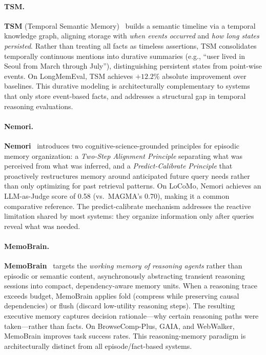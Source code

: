 \paragraph{TSM.}
\textbf{TSM} (Temporal Semantic
Memory)~\cite{tsm2026} builds a semantic timeline via a temporal
knowledge graph, aligning storage with \emph{when events occurred} and
\emph{how long states persisted}.  Rather than treating all facts as
timeless assertions, TSM consolidates temporally continuous mentions
into durative summaries (e.g., ``user lived in Seoul from March through
July''), distinguishing persistent states from point-wise events.
On LongMemEval, TSM achieves $+12.2\%$ absolute improvement over
baselines.  This durative modeling is architecturally complementary to
systems that only store event-based facts, and addresses a structural
gap in temporal reasoning evaluations.

\paragraph{Nemori.}
\textbf{Nemori}~\cite{nemori2025} introduces two cognitive-science-grounded
principles for episodic memory organization: a \emph{Two-Step
Alignment Principle} separating what was perceived from what was
inferred, and a \emph{Predict-Calibrate Principle} that proactively
restructures memory around anticipated future query needs rather than
only optimizing for past retrieval patterns.  On LoCoMo, Nemori
achieves an LLM-as-Judge score of 0.58 (vs.\ MAGMA's 0.70), making
it a common comparative reference.  The predict-calibrate mechanism
addresses the reactive limitation shared by most systems: they organize
information only after queries reveal what was needed.

\paragraph{MemoBrain.}
\textbf{MemoBrain}~\cite{memobraın2026} targets the \emph{working memory
of reasoning agents} rather than episodic or semantic content,
asynchronously abstracting transient reasoning sessions into compact,
dependency-aware memory units.  When a reasoning trace exceeds budget,
MemoBrain applies fold (compress while preserving causal dependencies)
or flush (discard low-utility reasoning steps).  The resulting executive
memory captures decision rationale---why certain reasoning paths were
taken---rather than facts.  On BrowseComp-Plus, GAIA, and WebWalker,
MemoBrain improves task success rates.  This reasoning-memory paradigm
is architecturally distinct from all episode/fact-based systems.

